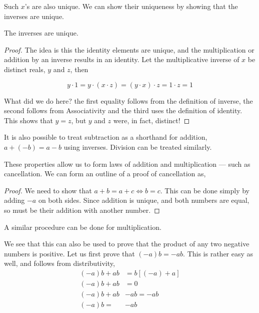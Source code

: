 Such \(x\)'s are also unique. We can show their uniqueness by showing that the inverses are unique.

\begin{proposition}
    The inverses are unique.
\end{proposition}

\begin{proof}
    The idea is this the identity elements are unique, and the multiplication or addition
    by an inverse results in an identity. Let the multiplicative inverse of \(x\) be 
    distinct reals, \(y\) and \(z\), then  

    \begin{equation*}
        y \cdot 1 = y \cdot (x \cdot z) = (y \cdot x) \cdot z = 1 \cdot z = 1
    \end{equation*}

    What did we do here? the first equality follows from the definition 
    of inverse, the second follows from Associativity and the third uses the 
    definition of identity. This shows that \(y = z\), but \(y\) and \(z\) 
    were, in fact, distinct! \lightning

\end{proof}

It is also possible to treat subtraction as a shorthand for addition, \(a + (-b) = a - b\) using 
inverses. Division can be treated similarly.

These properties allow us to form laws of addition and multiplication --- such as 
cancellation. We can form an outline of a proof of cancellation as, 

\begin{proof}
    We need to show that \(a + b = a + c \iff b = c\). 
    This can be done simply by adding \(-a\) on both sides. Since addition is unique, 
    and both numbers are equal, so must be their addition with another number. 
\end{proof}

A similar procedure can be done for multiplication.

We see that this can also be used to prove that the product of any two negative numbers is 
positive. Let us first prove that \((-a)b = -ab\). This is rather easy as well, and follows 
from distributivity,
\begin{align*}
    (-a)b + ab &= b[(-a) + a] \\
    (-a)b + ab &= 0 \\
    (-a)b + ab &- ab = -ab\\
    (-a)b = &-ab
\end{align*}

